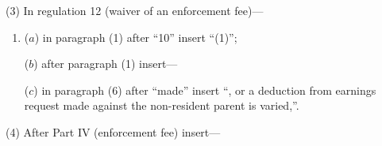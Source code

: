 \documentclass[12pt,a4paper]{article}
\begin{document}
(3)
In regulation 12 (waiver of an enforcement fee)—
\begin{enumerate}\item[]
($a$)
in paragraph (1) after “10” insert “(1)”;

($b$)
after paragraph (1) insert—
\begin{quotation}
\end{quotation}

($c$)
in paragraph (6) after “made” insert “, or a deduction from earnings request made against the non-resident parent is varied,”.
\end{enumerate}

(4)
After Part IV (enforcement fee) insert—
\end{document}
